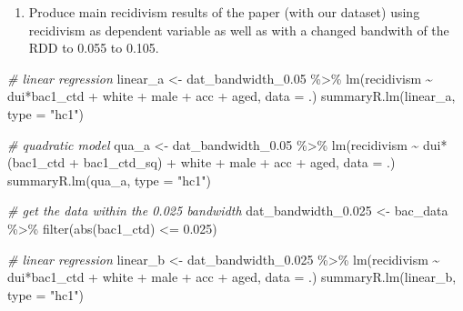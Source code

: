 \documentclass[
  11pt,
]{article}
\newenvironment{Shaded}{\begin{snugshade}}{\end{snugshade}}
\newcommand{\AttributeTok}[1]{\textcolor[rgb]{0.77,0.63,0.00}{#1}}
\newcommand{\CommentTok}[1]{\textcolor[rgb]{0.56,0.35,0.01}{\textit{#1}}}
\newcommand{\FloatTok}[1]{\textcolor[rgb]{0.00,0.00,0.81}{#1}}
\newcommand{\FunctionTok}[1]{\textcolor[rgb]{0.00,0.00,0.00}{#1}}
\newcommand{\NormalTok}[1]{#1}
\newcommand{\OtherTok}[1]{\textcolor[rgb]{0.56,0.35,0.01}{#1}}
\newcommand{\SpecialCharTok}[1]{\textcolor[rgb]{0.00,0.00,0.00}{#1}}
\newcommand{\StringTok}[1]{\textcolor[rgb]{0.31,0.60,0.02}{#1}}
\providecommand{\tightlist}{%
  \setlength{\itemsep}{0pt}\setlength{\parskip}{0pt}}
\begin{document}
\begin{enumerate}
\def\labelenumi{\arabic{enumi}.}
\setcounter{enumi}{2}
\tightlist
\item
  Produce main recidivism results of the paper (with our dataset) using
  recidivism as dependent variable as well as with a changed bandwith of
  the RDD to 0.055 to 0.105.
\end{enumerate}

\begin{Shaded}
\begin{Highlighting}[]
\CommentTok{\# linear regression}
\NormalTok{linear\_a }\OtherTok{\textless{}{-}}
\NormalTok{  dat\_bandwidth\_0}\FloatTok{.05} \SpecialCharTok{\%\textgreater{}\%}
  \FunctionTok{lm}\NormalTok{(recidivism }\SpecialCharTok{\textasciitilde{}}\NormalTok{ dui}\SpecialCharTok{*}\NormalTok{bac1\_ctd }\SpecialCharTok{+}\NormalTok{ white }\SpecialCharTok{+}\NormalTok{ male }\SpecialCharTok{+}\NormalTok{ acc }\SpecialCharTok{+}\NormalTok{ aged,}
     \AttributeTok{data =}\NormalTok{ .)}
\FunctionTok{summaryR.lm}\NormalTok{(linear\_a, }\AttributeTok{type =} \StringTok{"hc1"}\NormalTok{)}

\CommentTok{\# quadratic model}
\NormalTok{qua\_a }\OtherTok{\textless{}{-}}
\NormalTok{  dat\_bandwidth\_0}\FloatTok{.05} \SpecialCharTok{\%\textgreater{}\%}
  \FunctionTok{lm}\NormalTok{(recidivism }\SpecialCharTok{\textasciitilde{}}\NormalTok{ dui}\SpecialCharTok{*}\NormalTok{(bac1\_ctd }\SpecialCharTok{+}\NormalTok{ bac1\_ctd\_sq) }\SpecialCharTok{+}\NormalTok{ white }\SpecialCharTok{+}\NormalTok{ male }\SpecialCharTok{+}\NormalTok{ acc }\SpecialCharTok{+}\NormalTok{ aged,}
     \AttributeTok{data =}\NormalTok{ .)}
\FunctionTok{summaryR.lm}\NormalTok{(qua\_a, }\AttributeTok{type =} \StringTok{"hc1"}\NormalTok{)}


\CommentTok{\# get the data within the 0.025 bandwidth}
\NormalTok{dat\_bandwidth\_0}\FloatTok{.025} \OtherTok{\textless{}{-}}\NormalTok{ bac\_data }\SpecialCharTok{\%\textgreater{}\%} \FunctionTok{filter}\NormalTok{(}\FunctionTok{abs}\NormalTok{(bac1\_ctd) }\SpecialCharTok{\textless{}=} \FloatTok{0.025}\NormalTok{)}

\CommentTok{\# linear regression}
\NormalTok{linear\_b }\OtherTok{\textless{}{-}}
\NormalTok{  dat\_bandwidth\_0}\FloatTok{.025} \SpecialCharTok{\%\textgreater{}\%}
  \FunctionTok{lm}\NormalTok{(recidivism }\SpecialCharTok{\textasciitilde{}}\NormalTok{ dui}\SpecialCharTok{*}\NormalTok{bac1\_ctd }\SpecialCharTok{+}\NormalTok{ white }\SpecialCharTok{+}\NormalTok{ male }\SpecialCharTok{+}\NormalTok{ acc }\SpecialCharTok{+}\NormalTok{ aged,}
     \AttributeTok{data =}\NormalTok{ .)}
\FunctionTok{summaryR.lm}\NormalTok{(linear\_b, }\AttributeTok{type =} \StringTok{"hc1"}\NormalTok{)}


\end{Highlighting}
\end{Shaded}
\end{document}
